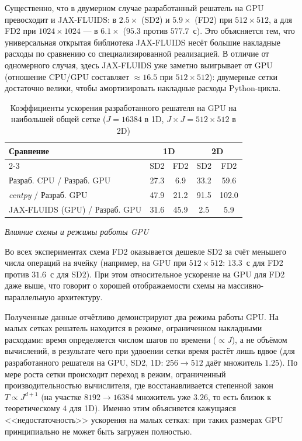\documentclass[a4paper,14pt]{extarticle}
\theoremstyle{theorem}
\theoremstyle{lemma}
\begin{document}
Существенно, что в двумерном случае разработанный решатель на GPU превосходит и
JAX-FLUIDS: в $2.5\times$ (SD2) и $5.9\times$ (FD2) при $512\times512$, а для FD2
при $1024\times1024$ --- в $6.1\times$ ($95.3$ против $577.7$~с). Это объясняется
тем, что универсальная открытая библиотека JAX-FLUIDS несёт большие накладные расходы по
сравнению со специализированной реализацией. В отличие от одномерного случая,
здесь JAX-FLUIDS уже заметно выигрывает от GPU (отношение CPU/GPU составляет
$\approx 16.5$ при $512\times512$): двумерные сетки достаточно велики, чтобы
амортизировать накладные расходы Python-цикла.

\begin{table}[!htbp]
    \centering
    \caption{Коэффициенты ускорения разработанного решателя на GPU на наибольшей
    общей сетке ($J=16384$ в 1D, $J\times J = 512\times512$ в 2D)}
    \vspace{0.1cm}
    \label{tab:speedup}
    \begin{tabular}{lcccc}
        \hline
        \multirow{2}{*}{Сравнение} & \multicolumn{2}{c}{1D} & \multicolumn{2}{c}{2D} \\
        \cline{2-3}\cline{4-5}
         & SD2 & FD2 & SD2 & FD2 \\
        \hline
        Разраб. CPU / Разраб. GPU       & 27.3 & 6.9  & 33.2 & 59.6  \\
        \textit{centpy} / Разраб. GPU   & 47.9 & 21.2 & 91.5 & 102.0 \\
        JAX-FLUIDS (GPU) / Разраб. GPU  & 31.6 & 45.9 & 2.5  & 5.9   \\
        \hline
    \end{tabular}
\end{table}

\textit{Влияние схемы и режимы работы GPU}

Во всех экспериментах схема FD2 оказывается дешевле SD2 за счёт меньшего числа
операций на ячейку (например, на GPU при $512\times512$: $13.3$~с для FD2 против
$31.6$~с для SD2). При этом относительное ускорение на GPU для FD2 даже выше, что
говорит о хорошей отображаемости схемы на массивно-параллельную архитектуру.

Полученные данные отчётливо демонстрируют два режима работы GPU. На малых сетках
решатель находится в режиме, ограниченном накладными расходами: время
определяется числом шагов по времени ($\propto J$), а не объёмом вычислений, в
результате чего при удвоении сетки время растёт лишь вдвое (для разработанного
решателя на GPU, SD2, 1D: $256 \to 512$ даёт множитель $1.25$). По мере роста
сетки происходит переход в режим, ограниченный производительностью вычислителя,
где восстанавливается степенной закон $T \propto J^{d+1}$ (на участке
$8192 \to 16384$ множитель уже $3.26$, то есть близок к теоретическому $4$ для
1D). Именно этим объясняется кажущаяся <<недостаточность>> ускорения на малых
сетках: при таких размерах GPU принципиально не может быть загружен полностью.
\end{document}
